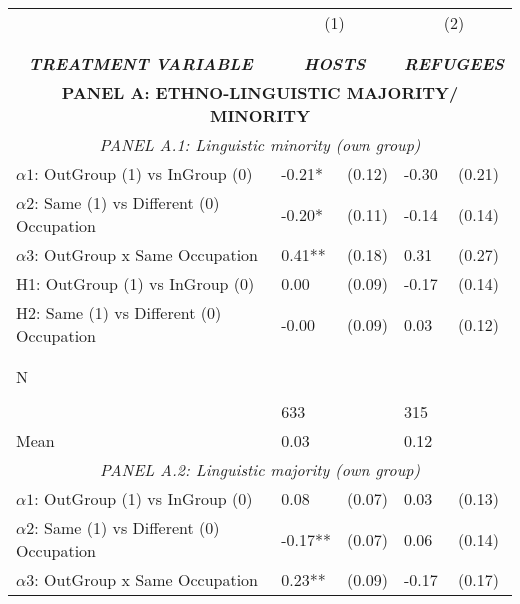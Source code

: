 \begin{tabular}{l*{4}{l}} \toprule 
                &\multicolumn{2}{c}{(1)}&\multicolumn{2}{c}{(2)}\\
                &\multicolumn{2}{c}{ } &\multicolumn{2}{c}{ } \\
\\[-0.6cm] \multicolumn{1}{c}{\textit{\textbf{TREATMENT VARIABLE}}} & \multicolumn{2}{c}{\textit{\textbf{HOSTS}}} & \multicolumn{2}{c}{\textit{\textbf{REFUGEES}}} \\ \midrule   \multicolumn{5}{c}{\textbf{PANEL A: ETHNO-LINGUISTIC MAJORITY/ MINORITY}} \\ \multicolumn{5}{c}{\textit{PANEL A.1: Linguistic minority (own group)}} \\  \midrule  
$\alpha1$: OutGroup (1) vs InGroup (0)&    -0.21*  &   (0.12)&    -0.30   &   (0.21)\\
$\alpha2$: Same (1) vs Different (0) Occupation&    -0.20*  &   (0.11)&    -0.14   &   (0.14)\\
 
$\alpha3$: OutGroup x Same Occupation&     0.41** &   (0.18)&     0.31   &   (0.27)\\
 
H1: OutGroup (1) vs InGroup (0)&     0.00   &   (0.09)&    -0.17   &   (0.14)\\
 
H2: Same (1) vs Different (0) Occupation&    -0.00   &   (0.09)&     0.03   &   (0.12)\\
 
  \\\\[-0.5cm] N \\\\[-0.6cm]&      633   &         &      315   &         \\
Mean            &     0.03&         &     0.12&         \\
 
  \multicolumn{5}{c}{\textit{PANEL A.2: Linguistic majority (own group)}} \\  \midrule  
$\alpha1$: OutGroup (1) vs InGroup (0)&        0.08   &      (0.07)&        0.03   &      (0.13)\\
$\alpha2$: Same (1) vs Different (0) Occupation&       -0.17** &      (0.07)&        0.06   &      (0.14)\\
 
$\alpha3$: OutGroup x Same Occupation&     0.23** &   (0.09)&    -0.17   &   (0.17)\\
 

\end{tabular}

